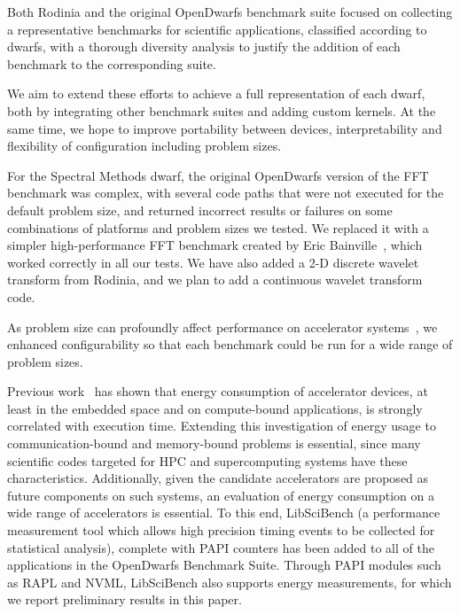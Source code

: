 \documentclass[../document.tex]{subfiles}
\begin{document}
\label{sec:extending_the_opendwarfs_benchmark_suite}

Both Rodinia and the original OpenDwarfs benchmark suite focused on collecting a representative benchmarks for scientific applications, classified according to dwarfs, with a thorough diversity analysis to justify the addition of each benchmark to the corresponding suite.

We aim to extend these efforts to achieve a full representation of each dwarf, both by integrating other benchmark suites and adding custom kernels.
At the same time, we hope to improve portability between devices, interpretability and flexibility of configuration including problem sizes.

For the Spectral Methods dwarf, the original OpenDwarfs version of the FFT benchmark was complex, with several code paths that were not executed for the default problem size, and returned incorrect results or failures on some combinations of platforms and problem sizes we tested.
We replaced it with a simpler high-performance FFT benchmark created by Eric Bainville~\cite{bainville2010fft}, which worked correctly in all our tests.
We have also added a 2-D discrete wavelet transform from Rodinia, and we plan to add a continuous wavelet transform code.

As problem size can profoundly affect performance on accelerator systems~\cite{marjanovic2016hpc}, we enhanced configurability so that each benchmark could be run for a wide range of problem sizes.

Previous work~\cite{johnston2017embedded} has shown that energy consumption of accelerator devices, at least in the embedded space and on compute-bound applications, is strongly correlated with execution time.
Extending this investigation of energy usage to communication-bound and memory-bound problems is essential, since many scientific codes targeted for HPC and supercomputing systems have these characteristics.
Additionally, given the candidate accelerators are proposed as future components on such systems, an evaluation of energy consumption on a wide range of accelerators is essential.
To this end, LibSciBench (a performance measurement tool which allows high precision timing events to be collected for statistical analysis), complete with PAPI counters has been added to all of the applications in the OpenDwarfs Benchmark Suite.
Through PAPI modules such as RAPL and NVML, LibSciBench also supports energy measurements, for which we report preliminary results in this paper.
\end{document}
